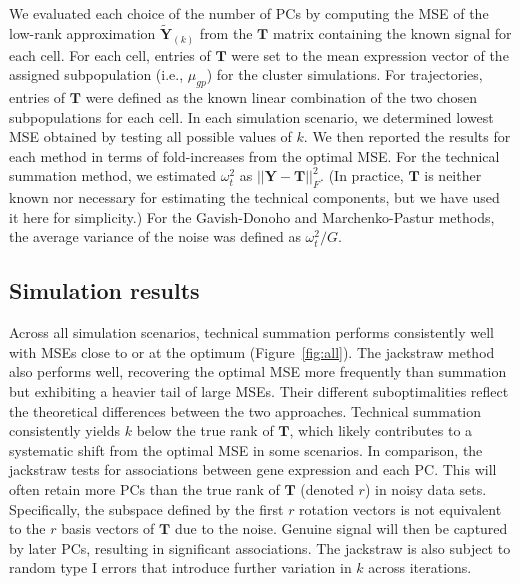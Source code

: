 \documentclass[10pt,letterpaper]{article}
\begin{document}
We evaluated each choice of the number of PCs by computing the MSE of the low-rank approximation $\mathbf{\tilde Y}_{(k)}$ from the $\mathbf{T}$ matrix containing the known signal for each cell.
For each cell, entries of $\mathbf{T}$ were set to the mean expression vector of the assigned subpopulation (i.e., $\mu_{gp}$) for the cluster simulations.
For trajectories, entries of $\mathbf{T}$ were defined as the known linear combination of the two chosen subpopulations for each cell.
In each simulation scenario, we determined lowest MSE obtained by testing all possible values of $k$.
We then reported the results for each method in terms of fold-increases from the optimal MSE.
For the technical summation method, we estimated $\omega^2_t$ as $||\mathbf{Y} - \mathbf{T}||^2_F$.
(In practice, $\mathbf{T}$ is neither known nor necessary for estimating the technical components, but we have used it here for simplicity.)
For the Gavish-Donoho and Marchenko-Pastur methods, the average variance of the noise was defined as $\omega^2_t/G$.

\subsection{Simulation results}
Across all simulation scenarios, technical summation performs consistently well with MSEs close to or at the optimum (Figure~\ref{fig:all}). 
The jackstraw method also performs well, recovering the optimal MSE more frequently than summation but exhibiting a heavier tail of large MSEs.
Their different suboptimalities reflect the theoretical differences between the two approaches.
Technical summation consistently yields $k$ below the true rank of $\mathbf{T}$, which likely contributes to a systematic shift from the optimal MSE in some scenarios.
In comparison, the jackstraw tests for associations between gene expression and each PC.
This will often retain more PCs than the true rank of $\mathbf{T}$ (denoted $r$) in noisy data sets.
Specifically, the subspace defined by the first $r$ rotation vectors is not equivalent to the $r$ basis vectors of $\mathbf{T}$ due to the noise.
Genuine signal will then be captured by later PCs, resulting in significant associations.
The jackstraw is also subject to random type I errors that introduce further variation in $k$ across iterations.
\end{document}
